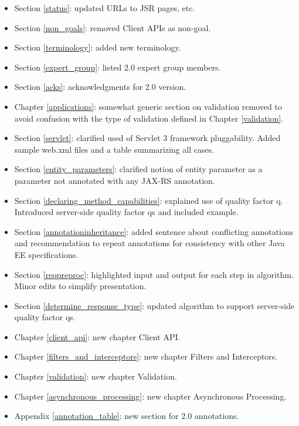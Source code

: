 \begin{itemize}
\item Section \ref{status}: updated URLs to JSR pages, etc.
\item Section \ref{non_goals}: removed Client APIs as non-goal.
\item Section \ref{terminology}: added new terminology.
\item Section \ref{expert_group}: listed 2.0 expert group members.
\item Section \ref{acks}: acknowledgments for 2.0 version.
\item Chapter \ref{applications}: somewhat generic section on validation removed to avoid confusion with the type of validation defined in Chapter \ref{validation}.
\item Section \ref{servlet}: clarified used of Servlet 3 framework pluggability. Added sample web.xml files and a table summarizing all cases.
\item Section \ref{entity_parameters}: clarified notion of entity parameter as a parameter not annotated with any JAX-RS annotation.
\item Section \ref{declaring_method_capabilities}: explained use of quality factor q. Introduced server-side quality factor qs and included example.
\item Section \ref{annotationinheritance}: added sentence about conflicting annotations and recommendation to repeat annotations for consistency with other Java EE specifications.
\item Section \ref{reqpreproc}: highlighted input and output for each step in algorithm. Minor edits to simplify presentation.
\item Section \ref{determine_response_type}: updated algorithm to support server-side quality factor qs.
\item Chapter \ref{client_api}: new chapter Client API.
\item Chapter \ref{filters_and_interceptors}: new chapter Filters and Interceptors.
\item Chapter \ref{validation}: new chapter Validation.
\item Chapter \ref{asynchronous_processing}: new chapter Asynchronous Processing.
\item Appendix \ref{annotation_table}: new section for 2.0 annotations.
\end{itemize}

